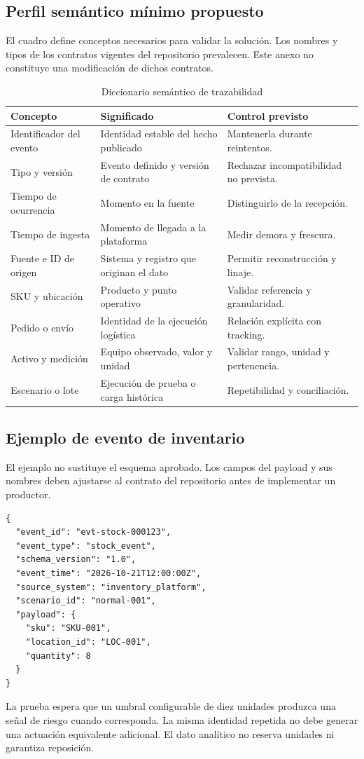 \documentclass[11pt,a4paper]{article}
\begin{document}
\subsection{Perfil semántico mínimo propuesto}
El cuadro define conceptos necesarios para validar la solución. Los nombres y tipos de los contratos vigentes del repositorio prevalecen. Este anexo no constituye una modificación de dichos contratos.
\begin{table}[H]
\caption{Diccionario semántico de trazabilidad}\label{tab:diccionario}
\small\begin{tabularx}{\linewidth}{@{}P{.28\linewidth}YY@{}}\toprule
Concepto & Significado & Control previsto\\\midrule
Identificador del evento & Identidad estable del hecho publicado & Mantenerla durante reintentos.\\
Tipo y versión & Evento definido y versión de contrato & Rechazar incompatibilidad no prevista.\\
Tiempo de ocurrencia & Momento en la fuente & Distinguirlo de la recepción.\\
Tiempo de ingesta & Momento de llegada a la plataforma & Medir demora y frescura.\\
Fuente e ID de origen & Sistema y registro que originan el dato & Permitir reconstrucción y linaje.\\
SKU y ubicación & Producto y punto operativo & Validar referencia y granularidad.\\
Pedido o envío & Identidad de la ejecución logística & Relación explícita con tracking.\\
Activo y medición & Equipo observado, valor y unidad & Validar rango, unidad y pertenencia.\\
Escenario o lote & Ejecución de prueba o carga histórica & Repetibilidad y conciliación.\\\bottomrule
\end{tabularx}
\end{table}

\subsection{Ejemplo de evento de inventario}
El ejemplo no sustituye el esquema aprobado. Los campos del payload y sus nombres deben ajustarse al contrato del repositorio antes de implementar un productor.
\begin{lstlisting}
{
  "event_id": "evt-stock-000123",
  "event_type": "stock_event",
  "schema_version": "1.0",
  "event_time": "2026-10-21T12:00:00Z",
  "source_system": "inventory_platform",
  "scenario_id": "normal-001",
  "payload": {
    "sku": "SKU-001",
    "location_id": "LOC-001",
    "quantity": 8
  }
}
\end{lstlisting}
La prueba espera que un umbral configurable de diez unidades produzca una señal de riesgo cuando corresponda. La misma identidad repetida no debe generar una actuación equivalente adicional. El dato analítico no reserva unidades ni garantiza reposición.
\end{document}
